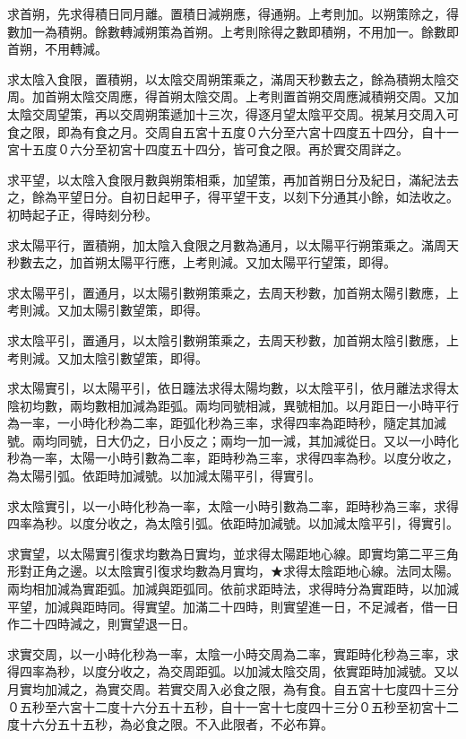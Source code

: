 \begin{pinyinscope}
求首朔，先求得積日同月離。置積日減朔應，得通朔。上考則加。以朔策除之，得數加一為積朔。餘數轉減朔策為首朔。上考則除得之數即積朔，不用加一。餘數即首朔，不用轉減。

求太陰入食限，置積朔，以太陰交周朔策乘之，滿周天秒數去之，餘為積朔太陰交周。加首朔太陰交周應，得首朔太陰交周。上考則置首朔交周應減積朔交周。又加太陰交周望策，再以交周朔策遞加十三次，得逐月望太陰平交周。視某月交周入可食之限，即為有食之月。交周自五宮十五度０六分至六宮十四度五十四分，自十一宮十五度０六分至初宮十四度五十四分，皆可食之限。再於實交周詳之。

求平望，以太陰入食限月數與朔策相乘，加望策，再加首朔日分及紀日，滿紀法去之，餘為平望日分。自初日起甲子，得平望干支，以刻下分通其小餘，如法收之。初時起子正，得時刻分秒。

求太陽平行，置積朔，加太陰入食限之月數為通月，以太陽平行朔策乘之。滿周天秒數去之，加首朔太陽平行應，上考則減。又加太陽平行望策，即得。

求太陽平引，置通月，以太陽引數朔策乘之，去周天秒數，加首朔太陽引數應，上考則減。又加太陽引數望策，即得。

求太陰平引，置通月，以太陰引數朔策乘之，去周天秒數，加首朔太陰引數應，上考則減。又加太陰引數望策，即得。

求太陽實引，以太陽平引，依日躔法求得太陽均數，以太陰平引，依月離法求得太陰初均數，兩均數相加減為距弧。兩均同號相減，異號相加。以月距日一小時平行為一率，一小時化秒為二率，距弧化秒為三率，求得四率為距時秒，隨定其加減號。兩均同號，日大仍之，日小反之；兩均一加一減，其加減從日。又以一小時化秒為一率，太陽一小時引數為二率，距時秒為三率，求得四率為秒。以度分收之，為太陽引弧。依距時加減號。以加減太陽平引，得實引。

求太陰實引，以一小時化秒為一率，太陰一小時引數為二率，距時秒為三率，求得四率為秒。以度分收之，為太陰引弧。依距時加減號。以加減太陰平引，得實引。

求實望，以太陽實引復求均數為日實均，並求得太陽距地心線。即實均第二平三角形對正角之邊。以太陰實引復求均數為月實均，★求得太陰距地心線。法同太陽。兩均相加減為實距弧。加減與距弧同。依前求距時法，求得時分為實距時，以加減平望，加減與距時同。得實望。加滿二十四時，則實望進一日，不足減者，借一日作二十四時減之，則實望退一日。

求實交周，以一小時化秒為一率，太陰一小時交周為二率，實距時化秒為三率，求得四率為秒，以度分收之，為交周距弧。以加減太陰交周，依實距時加減號。又以月實均加減之，為實交周。若實交周入必食之限，為有食。自五宮十七度四十三分０五秒至六宮十二度十六分五十五秒，自十一宮十七度四十三分０五秒至初宮十二度十六分五十五秒，為必食之限。不入此限者，不必布算。


\end{pinyinscope}
